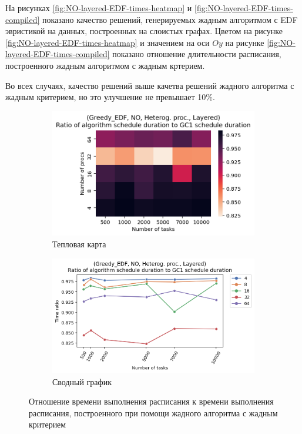 На рисунках \ref{fig:NO-layered-EDF-times-heatmap} и \ref{fig:NO-layered-EDF-times-compiled} показано качество решений, генерируемых жадным алгоритмом с EDF эвристикой на данных, построенных на слоистых графах. Цветом на рисунке \ref{fig:NO-layered-EDF-times-heatmap} и значением на оси $Oy$ на рисунке \ref{fig:NO-layered-EDF-times-compiled} показано отношение длительности расписания, построенного жадным алгоритмом с жадным кртерием.

Во всех случаях, качество решений выше качетва решений жадного алгоритма с жадным критерием, но это улучшение не превышает 10\%.

\begin{figure}[!htbp]
    \centering
    \begin{subfigure}{0.49\textwidth}
        \includegraphics[width=\textwidth]{imgs/unbalanced/NO_EDF/times.png}
        \caption{Тепловая карта}
        \label{fig:NO-disbalanced-EDF-times-heatmap}
    \end{subfigure}
    \hfill
    \begin{subfigure}{0.49\textwidth}
        \includegraphics[width=\textwidth]{imgs/unbalanced/NO_EDF/gr_amalgamated.png}
        \caption{Сводный график}
        \label{fig:NO-disbalanced-EDF-times-compiled}
    \end{subfigure}
    \caption{Отношение времени выполнения расписания к времени выполнения расписания, построенного при помощи жадного алгоритма с жадным критерием}
\end{figure}

